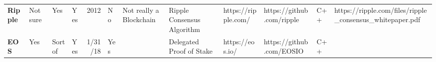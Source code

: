 \begin{table}[htbp]
\begin{adjustbox}{width=25cm, height=6cm, angle=270}
\begin{tabular}{llllrlp{17.915em}rlrrr}
      \rowcolor[rgb]{ .267,  .447,  .769} \textcolor[rgb]{ 1,  1,  1}{\textbf{Ripple}} & \cellcolor[rgb]{ 1,  .922,  .612}\textcolor[rgb]{ .612,  .341,  0}{Not sure} & \cellcolor[rgb]{ .776,  .937,  .808}\textcolor[rgb]{ 0,  .38,  0}{Yes} & \cellcolor[rgb]{ .776,  .937,  .808}\textcolor[rgb]{ 0,  .38,  0}{Yes} & \cellcolor[rgb]{ .851,  .882,  .949}\textcolor[rgb]{ .188,  .329,  .588}{2012} & \cellcolor[rgb]{ 1,  .78,  .808}\textcolor[rgb]{ .612,  0,  .024}{No} & \cellcolor[rgb]{ .851,  .882,  .949}\textcolor[rgb]{ .188,  .329,  .588}{Not really a Blockchain} & \multicolumn{1}{l}{\cellcolor[rgb]{ .851,  .882,  .949}\textcolor[rgb]{ .188,  .329,  .588}{Ripple Consensus Algorithm}} & \cellcolor[rgb]{ .851,  .882,  .949}\textcolor[rgb]{ .188,  .329,  .588}{https://ripple.com/} & \multicolumn{1}{l}{\cellcolor[rgb]{ .851,  .882,  .949}\textcolor[rgb]{ .188,  .329,  .588}{https://github.com/ripple}} & \multicolumn{1}{l}{\cellcolor[rgb]{ .851,  .882,  .949}\textcolor[rgb]{ .188,  .329,  .588}{C++}} & \multicolumn{1}{l}{\cellcolor[rgb]{ .851,  .882,  .949}\textcolor[rgb]{ .188,  .329,  .588}{https://ripple.com/files/ripple\_consensus\_whitepaper.pdf}} \\
      \rowcolor[rgb]{ .267,  .447,  .769} \textcolor[rgb]{ 1,  1,  1}{\textbf{EOS}} & \cellcolor[rgb]{ .776,  .937,  .808}\textcolor[rgb]{ 0,  .38,  0}{Yes} & \cellcolor[rgb]{ 1,  .922,  .612}\textcolor[rgb]{ .612,  .341,  0}{Sort of} & \cellcolor[rgb]{ .776,  .937,  .808}\textcolor[rgb]{ 0,  .38,  0}{Yes} & \cellcolor[rgb]{ 1,  1,  1}\textcolor[rgb]{ .188,  .329,  .588}{1/31/18} & \cellcolor[rgb]{ .776,  .937,  .808}\textcolor[rgb]{ 0,  .38,  0}{Yes} & \multicolumn{1}{r}{\cellcolor[rgb]{ 1,  1,  1}\textcolor[rgb]{ .188,  .329,  .588}{}} & \multicolumn{1}{l}{\cellcolor[rgb]{ 1,  1,  1}\textcolor[rgb]{ .188,  .329,  .588}{Delegated Proof of Stake}} & \cellcolor[rgb]{ 1,  1,  1}\textcolor[rgb]{ .188,  .329,  .588}{https://eos.io/} & \multicolumn{1}{l}{\cellcolor[rgb]{ 1,  1,  1}\textcolor[rgb]{ .188,  .329,  .588}{https://github.com/EOSIO}} & \multicolumn{1}{l}{\cellcolor[rgb]{ 1,  1,  1}\textcolor[rgb]{ .188,  .329,  .588}{C++}} & \cellcolor[rgb]{ 1,  1,  1}\textcolor[rgb]{ .188,  .329,  .588}{} \\

\end{tabular}
\end{adjustbox}
\end{table}
